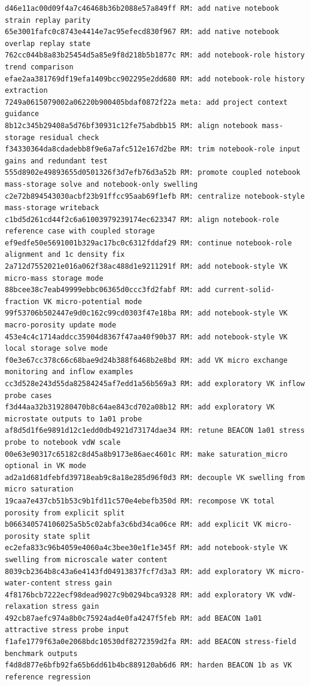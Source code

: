 \documentclass[10pt]{article}
\begin{document}
\begin{lstlisting}
d46e11ac00d09f4a7c46468b36b2088e57a849ff RM: add native notebook strain replay parity
65e3001fafc0c8743e4414e7ac95efecd830f967 RM: add native notebook overlap replay state
762cc044b8a83b25454d5a85e9f8d218b5b1877c RM: add notebook-role history trend comparison
efae2aa381769df19efa1409bcc902295e2dd680 RM: add notebook-role history extraction
7249a0615079002a06220b900405bdaf0872f22a meta: add project context guidance
8b12c345b29408a5d76bf30931c12fe75abdbb15 RM: align notebook mass-storage residual check
f34330364da8cdadebb8f9e6a7afc512e167d2be RM: trim notebook-role input gains and redundant test
555d8902e49893655d0501326f3d7efb76d3a52b RM: promote coupled notebook mass-storage solve and notebook-only swelling
c2e72b894543030acbf23b91ffcc95aab69f1efb RM: centralize notebook-style mass-storage writeback
c1bd5d261cd44f2c6a61003979239174ec623347 RM: align notebook-role reference case with coupled storage
ef9edfe50e5691001b329ac17bc0c6312fddaf29 RM: continue notebook-role alignment and 1c density fix
2a712d7552021e016a062f38ac488d1e9211291f RM: add notebook-style VK micro-mass storage mode
88bcee38c7eab49999ebbc06365d0ccc3fd2fabf RM: add current-solid-fraction VK micro-potential mode
99f53706b502447e9d0c162c99cd0303f47e18ba RM: add notebook-style VK macro-porosity update mode
453e4c4c1714addcc35904d8367f47aa40f90b37 RM: add notebook-style VK local storage solve mode
f0e3e67cc378c66c68bae9d24b388f6468b2e8bd RM: add VK micro exchange monitoring and inflow examples
cc3d528e243d55da82584245af7edd1a56b569a3 RM: add exploratory VK inflow probe cases
f3d44aa32b319280470b8c64ae843cd702a08b12 RM: add exploratory VK microstate outputs to 1a01 probe
af8d5d1f6e9891d12c1edd0db4921d73174dae34 RM: retune BEACON 1a01 stress probe to notebook vdW scale
00e63e90317c65182c8d45a8b9173e86aec4601c RM: make saturation_micro optional in VK mode
ad2a1d681dfebfd39718eab9c8a18e285d96f0d3 RM: decouple VK swelling from micro saturation
19caa7e437cb51b53c9b1fd11c570e4ebefb350d RM: recompose VK total porosity from explicit split
b066340574106025a5b5c02abfa3c6bd34ca06ce RM: add explicit VK micro-porosity state split
ec2efa833c96b4059e4060a4c3bee30e1f1e345f RM: add notebook-style VK swelling from microscale water content
8039cb2364b8c43a6e4143fd04913837fcf7d3a3 RM: add exploratory VK micro-water-content stress gain
4f8176bcb7222ecf98dead9027c9b0294bca9328 RM: add exploratory VK vdW-relaxation stress gain
492cb87aefc974a8b0c75924ad4e0fa4247f5feb RM: add BEACON 1a01 attractive stress probe input
f1afe1779f63a0e2068bdc10530df8272359d2fa RM: add BEACON stress-field benchmark outputs
f4d8d877e6bfb92fa65b6dd61b4bc889120ab6d6 RM: harden BEACON 1b as VK reference regression

\end{lstlisting}
\end{document}
